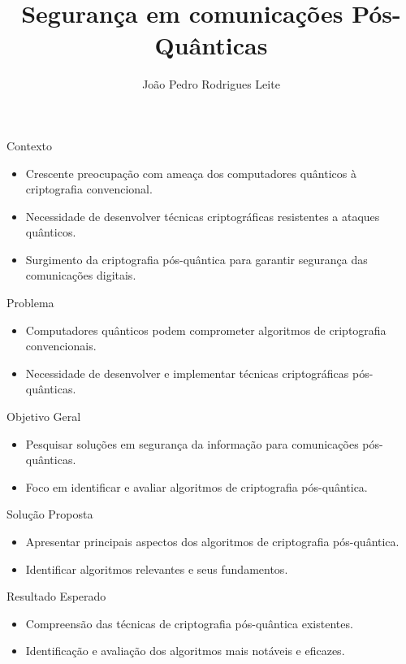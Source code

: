 \documentclass{beamer}
\title{Segurança em comunicações Pós-Quânticas}
\author{João Pedro Rodrigues Leite}
\date[Toledo, 2024]
\begin{document}
	
	\frame{\titlepage}
	
	\begin{frame}{Contexto}
		\begin{itemize}
			\item Crescente preocupação com ameaça dos computadores quânticos à criptografia convencional.
			\item Necessidade de desenvolver técnicas criptográficas resistentes a ataques quânticos.
			\item Surgimento da criptografia pós-quântica para garantir segurança das comunicações digitais.
		\end{itemize}
	\end{frame}
	
	\begin{frame}{Problema}
		\begin{itemize}
			\item Computadores quânticos podem comprometer algoritmos de criptografia convencionais.
			\item Necessidade de desenvolver e implementar técnicas criptográficas pós-quânticas.
		\end{itemize}
	\end{frame}
	
	\begin{frame}{Objetivo Geral}
		\begin{itemize}
			\item Pesquisar soluções em segurança da informação para comunicações pós-quânticas.
			\item Foco em identificar e avaliar algoritmos de criptografia pós-quântica.
		\end{itemize}
	\end{frame}
	
	\begin{frame}{Solução Proposta}
		\begin{itemize}
			\item Apresentar principais aspectos dos algoritmos de criptografia pós-quântica.
			\item Identificar algoritmos relevantes e seus fundamentos.
		\end{itemize}
	\end{frame}
	
	\begin{frame}{Resultado Esperado}
		\begin{itemize}
			\item Compreensão das técnicas de criptografia pós-quântica existentes.
			\item Identificação e avaliação dos algoritmos mais notáveis e eficazes.
		\end{itemize}
	\end{frame}
	
\end{document}
